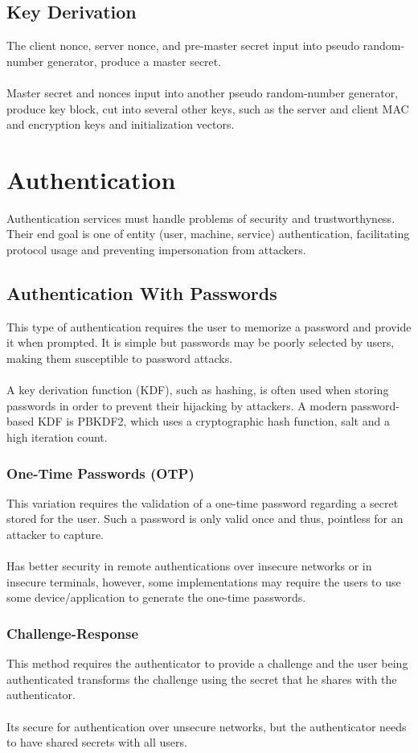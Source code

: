 \documentclass[10pt,a4paper]{report}
\begin{document}
\subsection{Key Derivation}
The client nonce, server nonce, and pre-master secret input into pseudo random-number generator, produce a master secret.\\
\\
Master secret and nonces input into another pseudo
random-number generator, produce key block, cut into several other keys, such as the server and client MAC and encryption keys and initialization vectors.
\section{Authentication}
Authentication services must handle problems of security and trustworthyness. Their end goal is one of entity (user, machine, service) authentication, facilitating protocol usage and preventing impersonation from attackers.
\subsection{Authentication With Passwords}
This type of authentication requires the user to memorize a password and provide it when prompted. It is simple but passwords may be poorly selected by users, making them susceptible to password attacks.\\
\\
A key derivation function (KDF), such as hashing, is often used when storing passwords in order to prevent their hijacking by attackers. A modern password-based KDF is PBKDF2, which uses a cryptographic hash function, salt and a high iteration count.
\subsubsection{One-Time Passwords (OTP)}
This variation requires the validation of a one-time password regarding a secret stored for the user. Such a password is only valid once and thus, pointless for an attacker to capture.\\
\\
Has better security  in remote authentications over insecure networks or in insecure terminals, however, some implementations may require the users to use some device/application to generate the one-time passwords.
\subsubsection{Challenge-Response}
This method requires the authenticator to provide a challenge and the user being authenticated transforms the challenge using the secret that he shares with the authenticator.\\
\\
Its secure for authentication over unsecure networks, but the authenticator needs to have shared secrets with all users.
\end{document}
